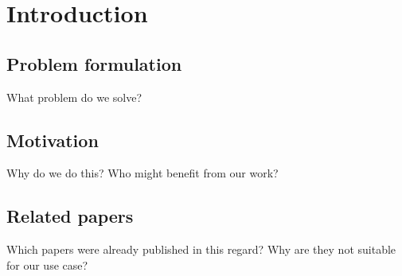 \section{Introduction}

\subsection{Problem formulation}
What problem do we solve?


\subsection{Motivation}
Why do we do this?
Who might benefit from our work?


\subsection{Related papers}
Which papers were already published in this regard?
Why are they not suitable for our use case?

